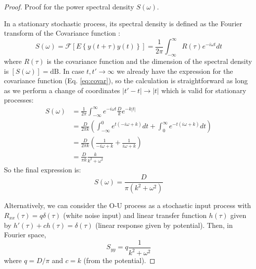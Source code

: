 \begin{proof}
	Proof for the power spectral density $S(\omega)$. 
	
	In a stationary stochastic process, its spectral density is defined as the Fourier transform of the Covariance function \cite{papoulis2002probability}:
	\begin{equation}
		S(\omega) = \mathcal{F}\left[ E\left\{ y(t+\tau)y(t)  \right\}  \right] = \frac{1}{2 \pi}\int_{-\infty}^{\infty}R(\tau)e^{-i\omega t} dt
		\label{eq:spectrum}
	\end{equation}
	where $R(\tau)$ is the covariance function and the dimension of the spectral density is $\left[S(\omega) \right] = \text{dB}$. In case $t,t' \to \infty$ we already have the expression for the covariance function (Eq. \ref{eq:covar}), so the calculation is straightforward as long as we perform a change of coordinates $|t'-t| \rightarrow |t|$ which is valid for stationary processes:
	\begin{align*}
		S(\omega) &= \frac{1}{2 \pi} \int_{-\infty}^{\infty} e^{-i \omega t} \frac{D}{k} e^{-k|t|} \\
		&= \frac{D}{2 \pi k} \left(\int_{-\infty}^{0} e^{t(-i\omega + k)} dt + \int_{0}^{\infty}e^{-t(i\omega +k)} dt \right) \\
		&= \frac{D}{2 \pi k} \left( \frac{1}{-i\omega + k} + \frac{1}{i\omega +k}   \right) \\
		&=\frac{D}{\pi k}\frac{k}{k^2 + \omega^2}
	\end{align*}
	So the final expression is: 
	\begin{equation}
		S(\omega) = \frac{D}{\pi(k^2 + \omega^2)}
	\end{equation}
	
	Alternatively, we can consider the \gls{O-U} process as a stochastic input process with $R_{xx}(\tau) = q \delta(\tau)$ (white noise input) and linear transfer function $h(\tau)$ given by $h'(\tau) + ch(\tau) = \delta(\tau)$ (linear response given by potential). Then, in Fourier space,
	\begin{equation*}
		S_{yy} = q \frac{1}{k^2 + \omega^2}
	\end{equation*}
	where $q = D/\pi$ and $c = k$ (from the potential).
\end{proof}


